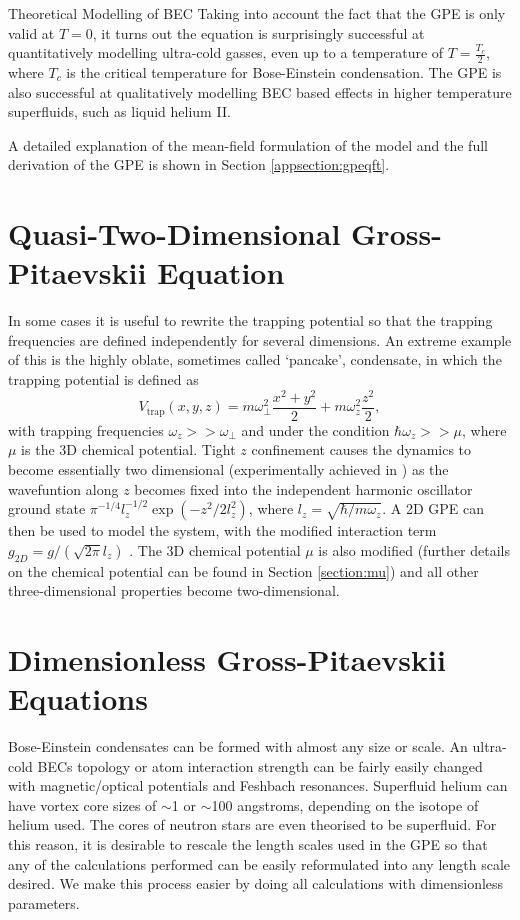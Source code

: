 \begin{chapter}{\label{cha:theoretical_model}Theoretical Modelling of BEC}
Taking into account the fact that the GPE is only valid at $T=0$, it turns out the equation is surprisingly successful at quantitatively modelling ultra-cold gasses, even up to a temperature of $T=\frac{T_c}{2}$, where $T_c$ is the critical temperature for Bose-Einstein condensation. The GPE is also successful at qualitatively modelling BEC based effects in higher temperature superfluids, such as liquid helium II.

A detailed explanation of the mean-field formulation of the model and the full derivation of the GPE is shown in Section \ref{appsection:gpeqft}.

\section{\label{section:quasi2dgpe} Quasi-Two-Dimensional Gross-Pitaevskii Equation}
	In some cases it is useful to rewrite the trapping potential so that the trapping frequencies are defined independently for several dimensions. An extreme example of this is the highly oblate, sometimes called `pancake', condensate, in which the trapping potential is defined as
	\begin{equation}
		V_{\mathrm{trap}}(x,y,z)=m\omega_\perp^2\frac{x^2+y^2}{2} + m\omega_z^2\frac{z^2}{2},
	\end{equation}
	with trapping frequencies $\omega_z >> \omega_\perp$ and under the condition $\hbar\omega_z >> \mu$, where $\mu$ is the 3D chemical potential. Tight $z$ confinement causes the dynamics to become essentially two dimensional (experimentally achieved in \cite{Gorlitz}) as the wavefuntion along $z$ becomes fixed into the independent harmonic oscillator ground state $\pi^{-1/4} l_z^{-1/2} \exp\left(-z^2/2l_z^2\right)$, where $l_z=\sqrt{\hbar/m \omega_z}$. A 2D GPE can then be used to model the system, with the modified interaction term $g_{2D} = g/( \sqrt{2\pi}l_z)$ \cite{parkerthesis}.  The 3D chemical potential $\mu$ is also modified (further details on the chemical potential can be found in Section \ref{section:mu}) and all other three-dimensional properties become two-dimensional.


\section{\label{section:gpedimless} Dimensionless Gross-Pitaevskii Equations}
	Bose-Einstein condensates can be formed with almost any size or scale. An ultra-cold BECs topology or atom interaction strength can be fairly easily changed with magnetic/optical potentials and Feshbach resonances. Superfluid helium can have vortex core sizes of $\sim$1 or $\sim$100 angstroms, depending on the isotope of helium used. The cores of neutron stars are even theorised to be superfluid. For this reason, it is desirable to rescale the length scales used in the GPE so that any of the calculations performed can be easily reformulated into any length scale desired. We make this process easier by doing all calculations with dimensionless parameters. 

\end{chapter}
